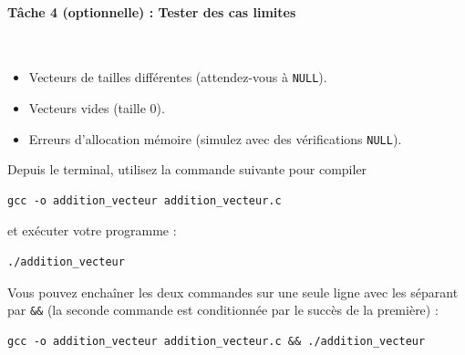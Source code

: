 \begin{wtodo}{}
\paragraph{T\^ache 4 (optionnelle) : Tester des cas limites}\,

\begin{itemize}
    \item Vecteurs de tailles diff\'erentes (attendez-vous à \texttt{NULL}).
    \item Vecteurs vides (taille 0).
    \item Erreurs d'allocation m\'emoire (simulez avec des v\'erifications \texttt{NULL}).
\end{itemize}
%
%
%

\end{wtodo}



\begin{howto}{}
\noindent Depuis le terminal, utilisez la commande suivante pour compiler 
\begin{verbatim}
gcc -o addition_vecteur addition_vecteur.c
\end{verbatim}
et ex\'ecuter votre programme :
\begin{verbatim}
./addition_vecteur
\end{verbatim}

Vous pouvez enchaîner les deux commandes sur une seule ligne avec les séparant par {\tt \&\&} (la seconde commande est conditionnée par le succès de la première) :
\begin{verbatim}
gcc -o addition_vecteur addition_vecteur.c && ./addition_vecteur
\end{verbatim}


\end{howto} 


